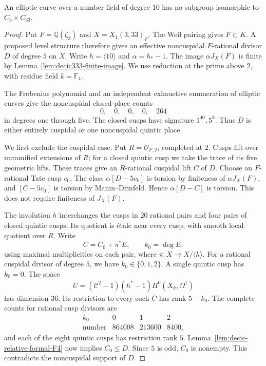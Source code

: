


\begin{proposition}\label{prop:decic-no333}
An elliptic curve over a number field of degree $10$ has no subgroup
isomorphic to $C_3\times C_{33}$.
\end{proposition}
\begin{proof}
Put $F=\mathbb Q(\zeta_3)$ and $X=X_1(3,33)_F$.
The Weil pairing gives $F\subset K$. A proposed level structure
therefore gives an effective noncuspidal $F$-rational divisor $D$
of degree $5$ on $X$. Write $h=\langle10\rangle$ and
$\alpha=h_*-1$. The image $\alpha J_X(F)$ is finite by
Lemma~\ref{lem:decic333-finite-image}.
We use reduction at the prime above $2$, with residue field
$k=\mathbb F_4$.

The Frobenius polynomial and an independent exhaustive enumeration
of elliptic curves give the noncuspidal closed-place counts
\[
                         0,\quad0,\quad0,\quad0,\quad264
\]
in degrees one through five. The closed cusps have signature
$1^{40},5^8$. Thus $\overline D$ is either entirely cuspidal or
one noncuspidal quintic place.

We first exclude the cuspidal case. Put $R=\mathcal O_{F,2}$,
completed at $2$. Cusps lift over unramified extensions of $R$;
for a closed quintic cusp we take the trace of its five geometric
lifts. These traces give an $R$-rational cuspidal lift $C$ of
$\overline D$. Choose an $F$-rational Tate cusp $c_0$.
The class $\alpha[D-5c_0]$ is torsion by finiteness of
$\alpha J_X(F)$, and $[C-5c_0]$ is torsion by
Manin--Drinfeld. Hence $\alpha[D-C]$ is torsion.
This does not require finiteness of $J_X(F)$.

The involution $h$ interchanges the cusps in $20$ rational pairs
and four pairs of closed quintic cusps. Its quotient is \'etale
near every cusp, with smooth local quotient over $R$.
Write
\[
              \overline C=\overline C_0+\pi^*\overline E,
              \qquad k_0=\deg\overline E,
\]
using maximal multiplicities on each pair, where
$\pi:X\to X/\langle h\rangle$.
For a rational cuspidal divisor of degree $5$, we have
$k_0\in\{0,1,2\}$. A single quintic cusp has $k_0=0$.
The space
\[
       U=(\mathcal C^2-1)(h^*-1)H^0(X_k,\Omega^1)
\]
has dimension $36$. Its restriction to every such
$\overline C$ has rank $5-k_0$.
The complete counts for rational cusp divisors are
\[
\begin{array}{c|rrr}
k_0&0&1&2\\ \hline
\text{number}&864008&213600&8400,
\end{array}
\]
and each of the eight quintic cusps has restriction rank $5$.
Lemma~\ref{lem:decic-relative-formal-F4} now implies $C_0\leq D$.
Since $5$ is odd, $C_0$ is nonempty. This contradicts the
noncuspidal support of $D$.


\end{proof}
